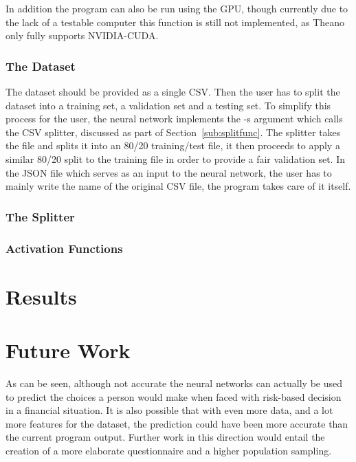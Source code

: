 \documentclass{article}
\begin{document}
In addition the program can also be run using the GPU, though currently due to the lack of a testable computer this function is still not implemented, as Theano only fully supports NVIDIA-CUDA\@.

\subsubsection{The Dataset}
\label{subsub:dataset}

The dataset should be provided as a single CSV\@. Then the user has to split the dataset into a training set, a validation set and a testing set. To simplify this process for the user, the neural network implements the -s argument which calls the CSV splitter, discussed as part of Section~\ref{sub:splitfunc}. The splitter takes the file and splits it into an 80/20 training/test file, it then proceeds to apply a similar 80/20 split to the training file in order to provide a fair validation set. In the JSON file which serves as an input to the neural network, the user has to mainly write the name of the original CSV file, the program takes care of it itself.

\subsubsection{The Splitter}
\label{subsub:splitter}

\subsubsection{Activation Functions}
\label{subsub:activation_functions}

\section{Results}
\label{sec:results}

\section{Future Work}
\label{sec:future_work}

As can be seen, although not accurate the neural networks can actually be used to predict the choices a person would make when faced with risk-based decision in a financial situation. It is also possible that with even more data, and a lot more features for the dataset, the prediction could have been more accurate than the current program output. Further work in this direction would entail the creation of a more elaborate questionnaire and a higher population sampling.
\end{document}
